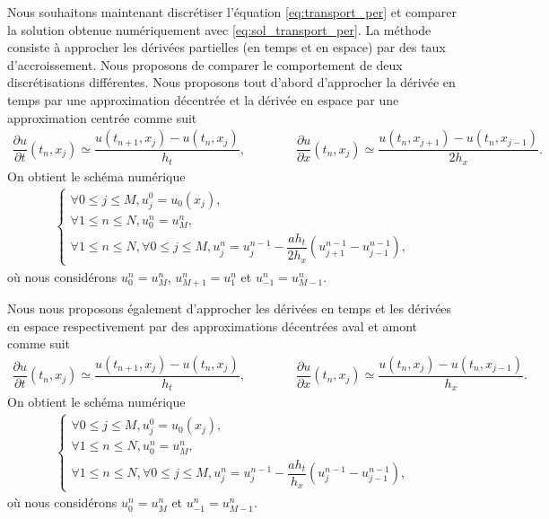 \documentclass[12pt,a4paper,twoside]{article}
\begin{document}
Nous souhaitons maintenant discr\'etiser l'\'equation
\eqref{eq:transport_per}
et comparer la solution obtenue num\'eriquement avec \eqref{eq:sol_transport_per}.
La m\'ethode consiste \`a approcher les d\'eriv\'ees partielles
(en temps et en espace) par des taux d'accroissement.
Nous proposons de comparer le comportement de deux discr\'etisations diff\'erentes.
Nous proposons tout d'abord d'approcher la d\'eriv\'ee en temps par une
approximation d\'ecentr\'ee et la d\'eriv\'ee en espace par une 
approximation centr\'ee comme suit
\begin{align*}
  \dfrac{\partial u}{\partial t}(t_n,x_j) \simeq \dfrac{u(t_{n+1},x_j) - u(t_n,x_j)}{h_t} ,
  \qquad \qquad 
  \dfrac{\partial u}{\partial x}(t_n,x_j) \simeq \dfrac{u(t_n,x_{j+1}) - u(t_n,x_{j-1})}{2 h_x} .
\end{align*}
On obtient le sch\'ema num\'erique
\begin{align}
  \label{eq:transport_DF_centre}
  \left\{
  \begin{array}{l}
    \forall 0 \leq j \leq M , 
    u_j^0 = u_0(x_j) ,
    \\
    \forall 1 \leq n \leq N, u_0^n = u_M^n ,
    \\
    \forall 1 \leq n \leq N, \forall 0 \leq j \leq M,
    u_j^n = u_j^{n-1} - \dfrac{a h_t}{2 h_x} (u_{j+1}^{n-1} - u_{j-1}^{n-1}) ,
  \end{array}
  \right.
\end{align}
o\`u nous consid\'erons $u_0^n = u_M^n$, $u_{M+1}^n = u_1^n$ et $u_{-1}^n = u_{M-1}^n$.

Nous nous proposons \'egalement d'approcher les d\'eriv\'ees en temps et les d\'eriv\'ees
en espace respectivement par des approximations d\'ecentr\'ees aval et amont comme suit
\begin{align}
  \label{eq:der_decentre_AM}
  \dfrac{\partial u}{\partial t}(t_n,x_j) \simeq \dfrac{u(t_{n+1},x_j) - u(t_n,x_j)}{h_t} ,
  \qquad \qquad 
  \dfrac{\partial u}{\partial x}(t_n,x_j) \simeq \dfrac{u(t_n,x_{j}) - u(t_n,x_{j-1})}{h_x} .
\end{align}
On obtient le sch\'ema num\'erique
\begin{align}
  \label{eq:transport_DF_decentre_AM}
  \left\{
  \begin{array}{l}
    \forall 0 \leq j \leq M , 
    u_j^0 = u_0(x_j) ,
    \\
    \forall 1 \leq n \leq N, u_0^n = u_M^n ,
    \\
    \forall 1 \leq n \leq N, \forall 0 \leq j \leq M,
    u_j^n = u_j^{n-1} - \dfrac{a h_t}{h_x} (u_{j}^{n-1} - u_{j-1}^{n-1}) ,
  \end{array}
  \right.
\end{align}
o\`u nous consid\'erons $u_0^n = u_M^n$ et $u_{-1}^n = u_{M-1}^n$.
\end{document}
